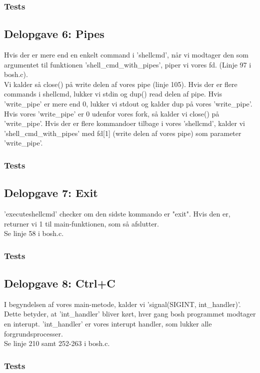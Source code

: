 \subsubsection{Tests}

\subsection{Delopgave 6: Pipes}
Hvis der er mere end en enkelt command i 'shellcmd', når vi modtager den som argumentet til funktionen 'shell\_cmd\_with\_pipes', piper vi vores fd. (Linje 97 i bosh.c).
\\Vi kalder så close() på write delen af vores pipe (linje 105). Hvis der er flere commands i shellcmd, lukker vi stdin og dup() read delen af pipe. Hvis 'write\_pipe' er mere end 0, lukker vi stdout og kalder dup på vores 'write\_pipe'.
\\Hvis vores 'write\_pipe' er 0 udenfor vores fork, så kalder vi close() på 'write\_pipe'. Hvis der er flere kommandoer tilbage i vores 'shellcmd', kalder vi 'shell\_cmd\_with\_pipes' med fd[1] (write delen af vores pipe) som parameter 'write\_pipe'.
\subsubsection{Tests}

\subsection{Delopgave 7: Exit}
'executeshellcmd' checker om den sidste kommando er "exit". Hvis den er, returner vi 1 til main-funktionen, som så afslutter.
\\Se linje 58 i bosh.c.
\subsubsection{Tests}

\subsection{Delopgave 8: Ctrl+C}
I begyndelsen af vores main-metode, kalder vi 'signal(SIGINT, int\_handler)'. Dette betyder, at 'int\_handler' bliver kørt, hver gang bosh programmet modtager en interupt. 'int\_handler' er vores interupt handler, som lukker alle forgrundsprocesser. 
\\Se linje 210 samt 252-263 i bosh.c.
\subsubsection{Tests}



